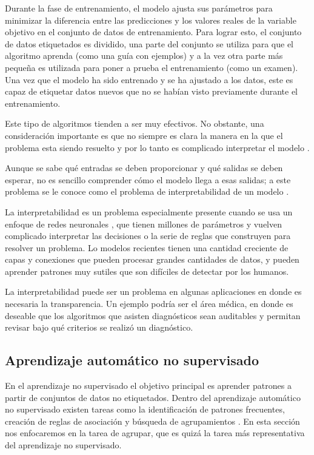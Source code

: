 Durante la fase de entrenamiento, el modelo ajusta sus parámetros para minimizar la diferencia entre las predicciones y los valores reales de la variable objetivo en el conjunto de datos de entrenamiento. Para lograr esto, el conjunto de datos etiquetados es dividido, una parte del conjunto se utiliza para que el algoritmo aprenda (como una guía con ejemplos) y a la vez otra parte más pequeña es utilizada para poner a prueba el entrenamiento (como un examen). Una vez que el modelo ha sido entrenado y se ha ajustado a los datos, este es capaz de etiquetar datos nuevos que no se habían visto previamente durante el entrenamiento. 

Este tipo de algoritmos tienden a ser muy efectivos. No obstante, una consideración importante es que no siempre es clara la manera en la que el problema esta siendo resuelto y por lo tanto es complicado interpretar el modelo \cite{rebala_introduction_2019}. 

Aunque se sabe qué entradas se deben proporcionar y qué salidas se deben esperar, no es sencillo comprender cómo el modelo llega a esas salidas; a este problema se le conoce como el problema de interpretabilidad de un modelo \cite{zhang_survey_2021, rebala_introduction_2019}. 

La interpretabilidad es un problema especialmente presente cuando se usa un enfoque de redes neuronales \cite{zhang_survey_2021}, que tienen millones de parámetros y vuelven complicado interpretar las decisiones o la serie de reglas que construyen para resolver un problema. Lo modelos recientes tienen una cantidad creciente de capas y conexiones que pueden procesar grandes cantidades de datos, y pueden aprender patrones muy sutiles que son difíciles de detectar por los humanos. 

La interpretabilidad puede ser un problema en algunas aplicaciones en donde es necesaria la transparencia. Un ejemplo podría ser el área médica, en donde es deseable que los algoritmos que asisten diagnósticos sean auditables y permitan revisar bajo qué criterios se realizó un diagnóstico.

\subsection{Aprendizaje automático no supervisado}

En el aprendizaje no supervisado el objetivo principal es aprender patrones a partir de conjuntos de datos no etiquetados. Dentro del aprendizaje automático no supervisado existen tareas como la identificación de patrones frecuentes, creación de reglas de asociación y búsqueda de agrupamientos \cite{kubat_introduction_2017}. En esta sección nos enfocaremos en la tarea de agrupar, que es quizá la tarea más representativa del aprendizaje no supervisado. 

